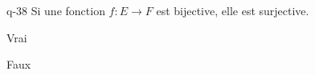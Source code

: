 \begin{truefalse}{q-38}
Si une fonction $f : E\to F$ est bijective, elle est surjective.
\item* Vrai
\item Faux
\end{truefalse}

